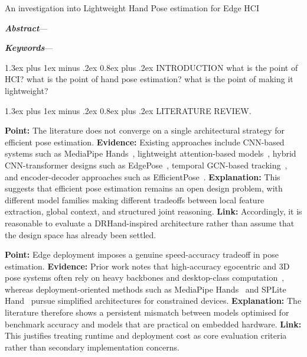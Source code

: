 \documentclass[10pt,letterpaper]{article}
\makeatletter
\renewcommand\section{\@startsection{section}{1}{\z@}%
  {1.3ex plus 1ex minus .2ex}%
  {0.8ex plus .2ex}%
  {\centering\normalfont\small\scshape}}
\makeatother
\begin{document}
\begin{center}
{\LARGE An investigation into Lightweight Hand Pose estimation for Edge HCI\par}
\end{center}

\vspace{0.6em}
\noindent\textbf{\textit{Abstract}}---

\vspace{0.6em}
\noindent\textbf{\textit{Keywords}}---

\section{INTRODUCTION}
what is the point of HCI?
what is the point of hand pose estimation?
what is the point of making it lightweight?



\section{LITERATURE REVIEW}.

\medskip
\noindent\textbf{Point:} The literature does not converge on a single architectural strategy for efficient pose estimation.  
\textbf{Evidence:} Existing approaches include CNN-based systems such as MediaPipe Hands~\cite{mediapipe}, lightweight attention-based models~\cite{attentionlite}, hybrid CNN-transformer designs such as EdgePose~\cite{edgepose}, temporal GCN-based tracking~\cite{handobjectgcn}, and encoder-decoder approaches such as EfficientPose~\cite{efficientpose}.  
\textbf{Explanation:} This suggests that efficient pose estimation remains an open design problem, with different model families making different tradeoffs between local feature extraction, global context, and structured joint reasoning.  
\textbf{Link:} Accordingly, it is reasonable to evaluate a DRHand-inspired architecture rather than assume that the design space has already been settled.

\medskip
\noindent\textbf{Point:} Edge deployment imposes a genuine speed-accuracy tradeoff in pose estimation.  
\textbf{Evidence:} Prior work notes that high-accuracy egocentric and 3D pose systems often rely on heavy backbones and desktop-class computation~\cite{everydayegohands}, whereas deployment-oriented methods such as MediaPipe Hands~\cite{mediapipe} and SPLite Hand~\cite{splitehand} pursue simplified architectures for constrained devices.  
\textbf{Explanation:} The literature therefore shows a persistent mismatch between models optimised for benchmark accuracy and models that are practical on embedded hardware.  
\textbf{Link:} This justifies treating runtime and deployment cost as core evaluation criteria rather than secondary implementation concerns.
\end{document}
